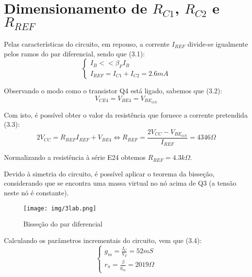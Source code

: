 \documentclass[a4paper,2pt]{report}
\begin{document}
\section{Dimensionamento de \(R_{C1}\), \(R_{C2}\) e \(R_{REF}\)}
\par Pelas características do circuito, em repouso, a corrente \(I_{REF}\) divide-se igualmente pelos ramos do par diferencial, sendo que (3.1):
\begin{equation}
    \begin{cases}
        I_{B} << \beta_F I_{B} \\
        I_{REF} = I_{C1} + I_{C2} = 2.6\textit{mA}
    \end{cases}
\end{equation}

\par Observando o modo como o transistor Q4 está ligado, sabemos que (3.2):
\begin{equation}
    V_{CE4} = V_{BE4} = V_{BE_{ON}}
\end{equation}

\par Com isto, é possível obter o valor da resistência que fornece a corrente pretendida (3.3):
\begin{equation}
    2V_{CC} = R_{REF}I_{REF} + V_{BE4} \Leftrightarrow R_{REF} = \frac{2V_{CC} - V_{BE_{ON}}}{I_{REF}} = 4346\Omega
\end{equation}
\par Normalizando a resistência à série E24 obtemos \(R_{REF} = 4.3k\Omega\).

\par Devido à simetria do circuito, é possível aplicar o teorema da bisseção, considerando que se encontra uma massa virtual no nó acima de Q3 (a tensão neste nó é constante).
\begin{figure}[H]
    \centering
    \texttt{[image: img/3lab.png]}
    \caption{Bisseção do par diferencial}
    \label{}
\end{figure}

\par Calculando os parâmetros incrementais do circuito, vem que (3.4):
\begin{equation}
    \begin{cases}
        g_m = \frac{I_C}{V_T} = 52\textit{mS} \\
        r_\pi = \frac{\beta}{g_m} = 2019\Omega
    \end{cases}
\end{equation}
\end{document}
